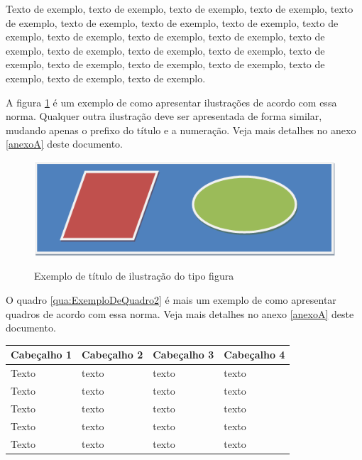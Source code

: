 \documentclass[
	12pt,				%
	oneside,			%
	a4paper,			%
	english,			%
	brazil				%
	]{abntex2ppgsi}
\begin{document}
Texto de exemplo, texto de exemplo, texto de exemplo, texto de exemplo, texto de exemplo, texto de exemplo, texto de exemplo, texto de exemplo, texto de exemplo, texto de exemplo, texto de exemplo, texto de exemplo, texto de exemplo, texto de exemplo, texto de exemplo, texto de exemplo, texto de exemplo, texto de exemplo, texto de exemplo, texto de exemplo, texto de exemplo, texto de exemplo, texto de exemplo.

A figura \ref{fig:figura-exemplo3} é um exemplo de como apresentar ilustrações de acordo com essa norma. Qualquer outra ilustração deve ser apresentada de forma similar, mudando apenas o prefixo do título e a numeração. Veja mais detalhes no anexo \ref{anexoA} deste documento.

\begin{figure}[htbp]
	\centering
	\caption{Exemplo de título de ilustração do tipo figura}
		\includegraphics{figura-exemplo.png}
	\label{fig:figura-exemplo3}
\end{figure}

O quadro \ref{qua:ExemploDeQuadro2} é mais um exemplo de como apresentar quadros de acordo com essa norma. Veja mais detalhes no anexo \ref{anexoA} deste documento.

\begin{quadro}[H]
	\centering
	\caption{Exemplo de título de quadro}
	\begin{tabular}{|p{1in} | p{1in} | p{1in} | p{1in} |} \hline
		
		Cabeçalho 1	& Cabeçalho 2	& Cabeçalho 3	& Cabeçalho 4 \\ \hline
		Texto	& texto & texto	& texto \\ \hline
		Texto	& texto & texto	& texto \\ \hline
		Texto	& texto & texto	& texto \\ \hline
		Texto	& texto & texto	& texto \\ \hline
		Texto	& texto & texto	& texto \\ \hline
		
	\end{tabular}
	\label{qua:ExemploDeQuadro2}
\end{quadro}
\end{document}
